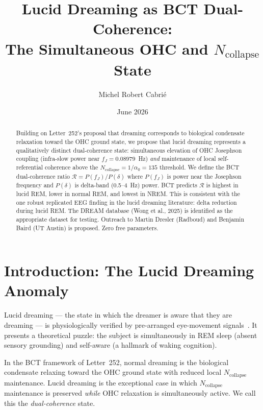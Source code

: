 \documentclass[aps,prl,twocolumn,showpacs,preprintnumbers]{revtex4-2}
\newcommand{\fJ}{f_J}
\newcommand{\Ncol}{N_{\mathrm{collapse}}}
\begin{document}

\title{Lucid Dreaming as BCT Dual-Coherence:\\
The Simultaneous OHC and $N_{\mathrm{collapse}}$ State}

\author{Michel Robert Cabri\'e}

\date{June 2026}

\begin{abstract}
Building on Letter~252's proposal that dreaming corresponds to
biological condensate relaxation toward the OHC ground state,
we propose that lucid dreaming represents a qualitatively
distinct dual-coherence state: simultaneous elevation of
OHC Josephson coupling (infra-slow power near $\fJ = 0.08979$~Hz)
\emph{and} maintenance of local self-referential coherence above
the $\Ncol = 1/\alpha_0 = 135$ threshold. We define the
BCT dual-coherence ratio $\mathcal{R} = P(\fJ)/P(\delta)$
where $P(\fJ)$ is power near the Josephson frequency and
$P(\delta)$ is delta-band (0.5--4~Hz) power. BCT predicts
$\mathcal{R}$ is highest in lucid REM, lower in normal REM,
and lowest in NREM. This is consistent with the one robust
replicated EEG finding in the lucid dreaming literature:
delta reduction during lucid REM. The DREAM database
(Wong et al., 2025) is identified as the appropriate dataset
for testing. Outreach to Martin Dresler (Radboud) and
Benjamin Baird (UT Austin) is proposed. Zero free parameters.
\end{abstract}

\maketitle

\section{Introduction: The Lucid Dreaming Anomaly}

Lucid dreaming --- the state in which the dreamer is aware that
they are dreaming --- is physiologically verified by pre-arranged
eye-movement signals~\cite{voss2009}. It presents a theoretical
puzzle: the subject is simultaneously in REM sleep (absent
sensory grounding) and self-aware (a hallmark of waking cognition).

In the BCT framework of Letter~252, normal dreaming is the
biological condensate relaxing toward the OHC ground state with
reduced local $\Ncol$ maintenance. Lucid dreaming is the
exceptional case in which $\Ncol$ maintenance is preserved
\emph{while} OHC relaxation is simultaneously active. We call
this the \emph{dual-coherence} state.
\end{document}
